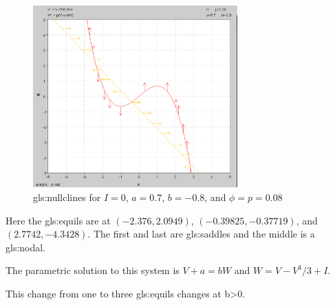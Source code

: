 \documentclass[class={myRUCProject}, crop=false]{standalone}
\begin{document}
\begin{figure}[ht]
    \centering
    \includegraphics[width=0.7\textwidth]{Pictures/Alex/Nullclines - negative.PNG}
    \caption{\glspl{gls:nullcline} for \(I=0\), \(a=0.7\), \(b=-0.8\), and \(\phi=p=0.08\)}
    \label{fig:nullclines-negative}
\end{figure}

Here the \glspl{gls:equil} are at \((-2.376, 2.0949)\), \((-0.39825, -0.37719)\), and \((2.7742, -4.3428)\). The first and last are \glspl{gls:saddle} and the middle is a \gls{gls:nodal}.

The parametric solution to this system is \(V+a=bW\) and \(W=V-V^3/3+I\).

This change from one to three \glspl{gls:equil} changes at b>0. 

\end{document}
